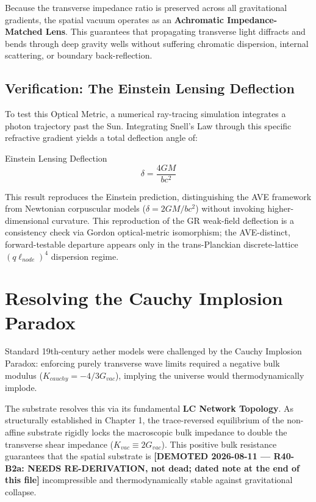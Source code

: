 Because the transverse impedance ratio is preserved across all gravitational gradients, the spatial vacuum operates as an \textbf{Achromatic Impedance-Matched Lens}. This guarantees that propagating transverse light diffracts and bends through deep gravity wells without suffering chromatic dispersion, internal scattering, or boundary back-reflection.


\subsection{Verification: The Einstein Lensing Deflection}
To test this Optical Metric, a numerical ray-tracing simulation integrates a photon trajectory past the Sun. Integrating Snell's Law through this specific refractive gradient yields a total deflection angle of:
\begin{resultbox}{Einstein Lensing Deflection}
\begin{equation}
    \delta = \frac{4GM}{b c^2}
\end{equation}
\end{resultbox}
This result reproduces the Einstein prediction, distinguishing the AVE framework from Newtonian corpuscular models ($\delta = 2GM/bc^2$) without invoking higher-dimensional curvature. This reproduction of the GR weak-field deflection is a consistency check via Gordon optical-metric isomorphism; the AVE-distinct, forward-testable departure appears only in the trans-Planckian discrete-lattice $(q\ell_{node})^4$ dispersion regime.

\section{Resolving the Cauchy Implosion Paradox}

Standard 19th-century aether models were challenged by the Cauchy Implosion Paradox:
enforcing purely transverse wave limits required a negative bulk modulus ($K_{cauchy}=
-4/3G_{vac}$), implying the universe would thermodynamically implode.

The substrate resolves this via its fundamental \textbf{LC Network Topology}. As structurally established
in Chapter 1, the trace-reversed equilibrium of the non-affine substrate rigidly
locks the macroscopic bulk impedance to double the transverse shear impedance ($K_{vac}\equiv2G_{vac}$).
This positive bulk resistance guarantees that the spatial substrate is \textbf{[DEMOTED 2026-08-11 --- R40-B2a: NEEDS RE-DERIVATION, not dead; dated note at the end of this file]}
incompressible and thermodynamically stable against gravitational collapse.

